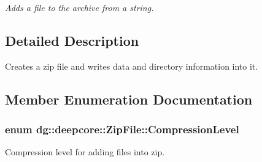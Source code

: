\begin{DoxyCompactItemize}
\begin{DoxyCompactList}\small\item\em Adds a file to the archive from a string. \end{DoxyCompactList}\end{DoxyCompactItemize}


\subsection{Detailed Description}
Creates a zip file and writes data and directory information into it. 

\subsection{Member Enumeration Documentation}
\subsubsection[{\texorpdfstring{Compression\+Level}{CompressionLevel}}]{\setlength{\rightskip}{0pt plus 5cm}enum {\bf dg\+::deepcore\+::\+Zip\+File\+::\+Compression\+Level}}\hypertarget{classdg_1_1deepcore_1_1_zip_file_afbf537eaa2281817c203388707564bdd}{}\label{classdg_1_1deepcore_1_1_zip_file_afbf537eaa2281817c203388707564bdd}


Compression level for adding files into zip. 

